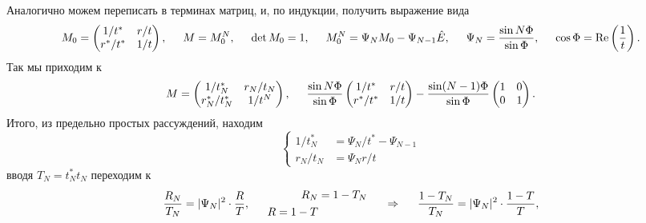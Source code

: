 Аналогично можем переписать в терминах матриц, и, по индукции, получить выражение вида
\begin{equation*}
    M_0 = \begin{pmatrix}
        1/t^* & r/t  \\
        r^*/t^* & 1/t  \\
    \end{pmatrix},
    \hspace{5 mm} 
    M = M_0^N, \hspace{5 mm} 
    \det M_0 = 1,
    \hspace{5 mm} 
    M_0^N = \Psi_N M_0 - \Psi_{N-1} \hat{E},
    \hspace{5 mm} 
    \Psi_N = \frac{\sin N \Phi}{\sin \Phi},
    \hspace{5 mm} 
    \cos \Phi = \Re\left(\frac{1}{t}\right).
\end{equation*}
Так мы приходим к 
\begin{equation*}
    M = \begin{pmatrix}
        1/t^*_N & r_N/t_N  \\
        r^*_N / t^*_N & 1/t^N  \\
    \end{pmatrix},
    \hspace{5 mm} 
    \frac{\sin N \Phi}{\sin \Phi} \begin{pmatrix}
        1/t^* & r/t  \\
        r^*/t^* & 1/t  \\
    \end{pmatrix} - \frac{\sin (N-1)\Phi}{\sin \Phi} \begin{pmatrix}
        1 & 0  \\
        0 & 1  \\
    \end{pmatrix}.
\end{equation*}
Итого, из предельно простых рассуждений, находим
\begin{equation*}
    \left\{\begin{aligned}
        1/t_N^* &= \Psi_N / t^* - \Psi_{N-1} \\
        r_N / t_N &= \Psi_N r / t
    \end{aligned}\right.
\end{equation*}
вводя $T_N = t_N^* t_N$ переходим к 
\begin{equation*}
    \frac{R_N}{T_N} = |\Psi_N|^2 \cdot \frac{R}{T}, \hspace{5 mm} 
    \left.\begin{aligned}
        R_N &= 1 - T_N \\
        R = 1 - T \\
    \end{aligned}\right.
    \hspace{0.5cm} \Rightarrow \hspace{0.5cm}
    \frac{1-T_N}{T_N} = |\Psi_N|^2 \cdot \frac{1-T}{T},
\end{equation*}
